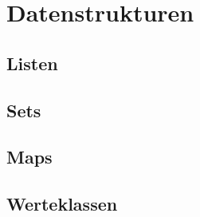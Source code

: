 \section{Datenstrukturen}

\subsection{Listen}

\subsection{Sets}

\subsection{Maps}

\subsection{Werteklassen}